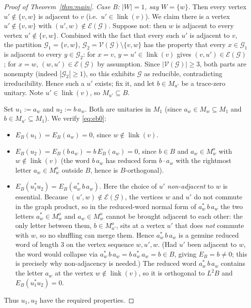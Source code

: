 \documentclass[a4paper, 11pt, reqno]{amsart}
\numberwithin{equation}{section}
\theoremstyle{plain}
\theoremstyle{remark}
\theoremstyle{definition}
\newcommand{\VV}{{\mathcal V}}
\newcommand{\EE}{{\mathcal E}}
\newcommand{\GG}{{\mathcal G}}
\begin{document}
\begin{proof}[Proof of Theorem~\ref{thm:main}]
\emph{Case B: $|W|=1$, say $W=\{w\}$.} Then every vertex $u'\notin\{v,w\}$ is adjacent to $v$ (i.e.\ $u'\in\operatorname{link}(v)$). We claim there is a vertex $u'\notin\{v,w\}$ with $(u',w)\notin\EE(\GG)$. Suppose not: then $w$ is adjacent to every vertex $u'\notin\{v,w\}$. Combined with the fact that every such $u'$ is adjacent to $v$, the partition $\GG_1=\{v,w\}$, $\GG_2=\VV(\GG)\setminus\{v,w\}$ has the property that every $x\in\GG_1$ is adjacent to every $y\in\GG_2$: for $x=v$, $y=u'\in\operatorname{link}(v)$ gives $(v,u')\in\EE(\GG)$; for $x=w$, $(w,u')\in\EE(\GG)$ by assumption. Since $|\VV(\GG)|\ge3$, both parts are nonempty (indeed $|\GG_2|\ge1$), so this exhibits $\GG$ as reducible, contradicting irreducibility. Hence such a $u'$ exists; fix it, and let $b\in M_{u'}$ be a trace-zero unitary. Note $u'\in\operatorname{link}(v)$, so $M_{u'}\subseteq B$.

Set $u_1:=a_w$ and $u_2:=b\,a_w$. Both are unitaries in $M_1$ (since $a_w\in M_w\subseteq M_1$ and $b\in M_{u'}\subseteq M_1$). We verify \eqref{eq:eb0}:
\begin{itemize}
\item $E_B(u_1)=E_B(a_w)=0$, since $w\notin\operatorname{link}(v)$.
\item $E_B(u_2)=E_B(b\,a_w)=b\,E_B(a_w)=0$, since $b\in B$ and $a_w\in M_w^o$ with $w\notin\operatorname{link}(v)$ (the word $b\,a_w$ has reduced form $b\cdot a_w$ with the rightmost letter $a_w\in M_w^o$ outside $B$, hence is $B$-orthogonal).
\item $E_B(u_1^*u_2)=E_B(a_w^*\,b\,a_w)$. Here the choice of $u'$ \emph{non-adjacent} to $w$ is essential. Because $(u',w)\notin\EE(\GG)$, the vertices $w$ and $u'$ do not commute in the graph product, so in the reduced-word normal form of $a_w^*\,b\,a_w$ the two letters $a_w^*\in M_w^o$ and $a_w\in M_w^o$ cannot be brought adjacent to each other: the only letter between them, $b\in M_{u'}^o$, sits at a vertex $u'$ that does \emph{not} commute with $w$, so no shuffling can merge them. Hence $a_w^*\,b\,a_w$ is a genuine reduced word of length $3$ on the vertex sequence $w,u',w$. (Had $u'$ been adjacent to $w$, the word would collapse via $a_w^*\,b\,a_w=b\,a_w^*\,a_w=b\in B$, giving $E_B=b\neq0$; this is precisely why non-adjacency is needed.) The reduced word $a_w^*\,b\,a_w$ contains the letter $a_w$ at the vertex $w\notin\operatorname{link}(v)$, so it is orthogonal to $L^2B$ and $E_B(u_1^*u_2)=0$.
\end{itemize}
Thus $u_1,u_2$ have the required properties.


\end{proof}
\end{document}
